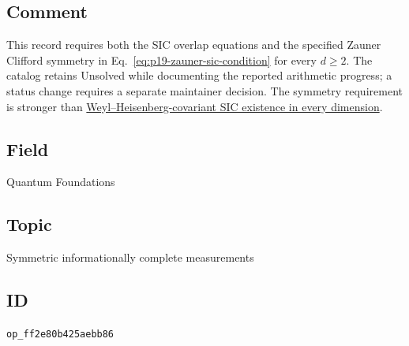 \subsection*{Comment}

This record requires both the SIC overlap equations and the specified
  Zauner Clifford symmetry in Eq.~\eqref{eq:p19-zauner-sic-condition} for
  every $d\ge2$. The catalog retains Unsolved while documenting the reported
  arithmetic progress; a status change requires a separate maintainer
  decision. The symmetry requirement is stronger than
  \href{https://qiqc-op.com/problem/op_6ba929179cc40c0a/}{Weyl--Heisenberg-covariant SIC existence in every dimension}.

\subsection*{Field}

Quantum Foundations

\subsection*{Topic}

Symmetric informationally complete measurements

\subsection*{ID}

\texttt{op\_ff2e80b425aebb86}
